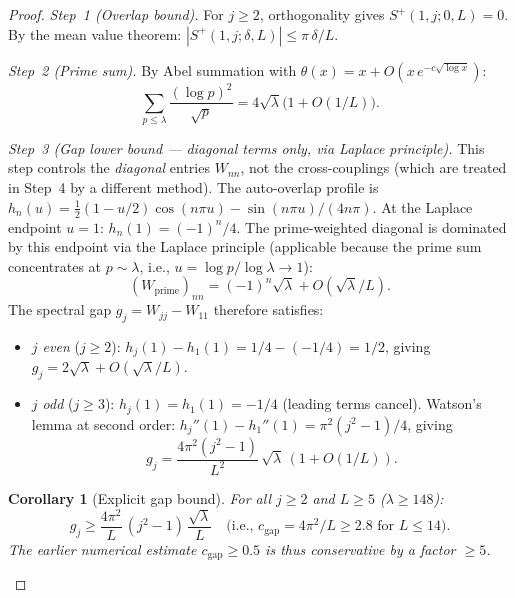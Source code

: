 \documentclass[12pt,a4paper]{article}
\newtheorem{corollary}[theorem]{Corollary}
\theoremstyle{definition}
\theoremstyle{remark}
\begin{document}
\begin{proof}
\emph{Step~1 (Overlap bound).} For $j \geq 2$, orthogonality gives $S^+(1,j;0,L) = 0$. By the mean value theorem: $|S^+(1,j;\delta,L)| \leq \pi\,\delta/L$.

\emph{Step~2 (Prime sum).} By Abel summation with $\theta(x) = x + O(x\,e^{-c\sqrt{\log x}})$:
\[
  \sum_{p \leq \lambda}\frac{(\log p)^2}{\sqrt{p}} = 4\sqrt{\lambda}\bigl(1 + O(1/L)\bigr).
\]

\emph{Step~3 (Gap lower bound --- diagonal terms only, via Laplace principle).} This step controls the \emph{diagonal} entries $W_{nn}$, not the cross-couplings (which are treated in Step~4 by a different method). The auto-overlap profile is $h_n(u) = \tfrac{1}{2}(1-u/2)\cos(n\pi u) - \sin(n\pi u)/(4n\pi)$. At the Laplace endpoint $u = 1$: $h_n(1) = (-1)^n/4$. The prime-weighted diagonal is dominated by this endpoint via the Laplace principle (applicable because the prime sum concentrates at $p \sim \lambda$, i.e., $u = \log p / \log\lambda \to 1$):
\[
  (W_{\mathrm{prime}})_{nn} = (-1)^n\sqrt{\lambda} + O(\sqrt{\lambda}/L).
\]
The spectral gap $g_j = W_{jj} - W_{11}$ therefore satisfies:
\begin{itemize}
  \item \emph{$j$ even} ($j \geq 2$): $h_j(1) - h_1(1) = 1/4 - (-1/4) = 1/2$, giving $g_j = 2\sqrt{\lambda} + O(\sqrt{\lambda}/L)$.
  \item \emph{$j$ odd} ($j \geq 3$): $h_j(1) = h_1(1) = -1/4$ (leading terms cancel). Watson's lemma at second order: $h_j''(1) - h_1''(1) = \pi^2(j^2-1)/4$, giving
  \begin{equation}
  \label{eq:gap-odd}
    g_j = \frac{4\pi^2(j^2-1)}{L^2}\,\sqrt{\lambda}\,(1 + O(1/L)).
  \end{equation}
\end{itemize}

\begin{corollary}[Explicit gap bound]
\label{cor:explicit-gap}
For all $j \geq 2$ and $L \geq 5$ ($\lambda \geq 148$):
\[
  g_j \geq \frac{4\pi^2}{L}\,(j^2 - 1)\,\frac{\sqrt{\lambda}}{L}
  \quad\text{(i.e., } c_{\mathrm{gap}} = 4\pi^2/L \geq 2.8 \text{ for } L \leq 14\text{)}.
\]
The earlier numerical estimate $c_{\mathrm{gap}} \geq 0.5$ is thus conservative by a factor $\geq 5$.
\end{corollary}


\end{proof}
\end{document}
